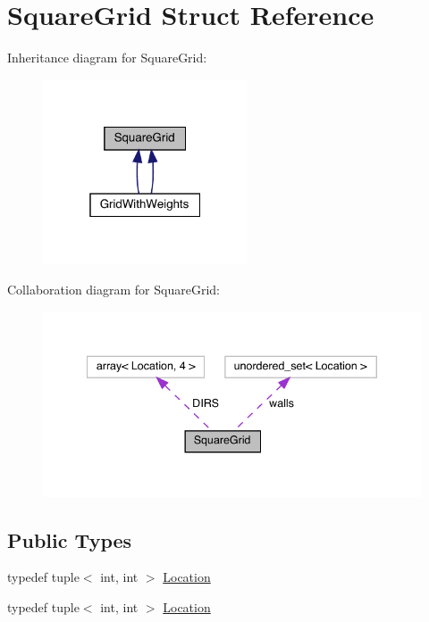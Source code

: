 \hypertarget{struct_square_grid}{}\section{Square\+Grid Struct Reference}
\label{struct_square_grid}


Inheritance diagram for Square\+Grid\+:\nopagebreak
\begin{figure}[H]
\begin{center}
\leavevmode
\includegraphics[width=172pt]{struct_square_grid__inherit__graph}
\end{center}
\end{figure}


Collaboration diagram for Square\+Grid\+:\nopagebreak
\begin{figure}[H]
\begin{center}
\leavevmode
\includegraphics[width=340pt]{struct_square_grid__coll__graph}
\end{center}
\end{figure}
\subsection*{Public Types}
\begin{DoxyCompactItemize}
\item 
typedef tuple$<$ int, int $>$ \hyperlink{struct_square_grid_a2c9a2cbd3912aa48ac97289abc3f1c0f}{Location}
\item 
typedef tuple$<$ int, int $>$ \hyperlink{struct_square_grid_a2c9a2cbd3912aa48ac97289abc3f1c0f}{Location}
\end{DoxyCompactItemize}
